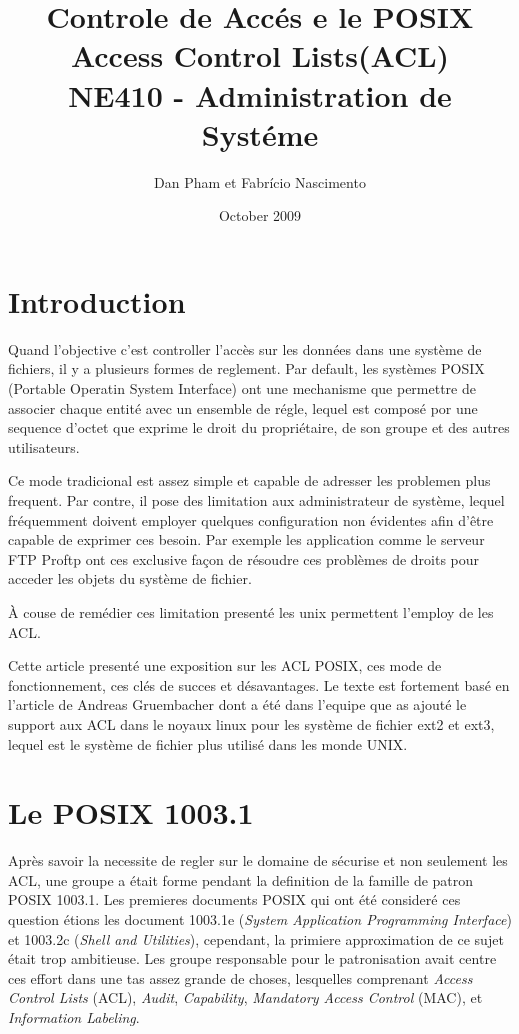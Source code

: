 \documentclass[draft]{article}
\title{\textbf{Controle de Accés e le POSIX Access Control Lists(ACL)} \\ NE410 - Administration de Systéme }
\author{Dan Pham et Fabrício Nascimento}
\date{October 2009}
\begin{document}
\maketitle
\newpage
\section*{Introduction}

Quand l'objective c'est controller l'accès sur les données dans une système de fichiers, il y a plusieurs formes de reglement. Par default, les systèmes POSIX (Portable Operatin System Interface)\cite{ieee1,ieee2} ont une mechanisme que permettre de associer chaque entité avec un ensemble de régle, lequel est composé por une sequence d'octet que exprime le droit du propriétaire, de son groupe et des autres utilisateurs. 

Ce mode tradicional est assez simple et capable de adresser les problemen plus frequent. Par contre, il pose des limitation aux administrateur de système, lequel fréquemment doivent employer quelques configuration non évidentes afin d'être capable de exprimer ces besoin. Par exemple les application comme le serveur FTP Proftp\cite{ftp} ont ces exclusive façon de résoudre ces problèmes de droits pour acceder les objets du système de fichier.

À couse de remédier ces limitation presenté les unix permettent l'employ de les ACL.   

Cette article presenté une exposition sur les ACL POSIX, ces mode de fonctionnement, ces clés de succes et désavantages. Le texte est fortement basé en l'article de Andreas Gruembacher\cite{aclsuse} dont a été dans l'equipe que as ajouté le support aux ACL dans le noyaux linux pour les système de fichier ext2 et ext3, lequel est le système de fichier plus utilisé dans les monde UNIX.

\section*{Le POSIX 1003.1}

Après savoir la necessite de regler sur le domaine de sécurise et non seulement les ACL, une groupe a était forme pendant la definition de la famille de patron POSIX 1003.1. Les premieres documents POSIX qui ont été consideré ces question étions les document 1003.1e (\emph{System Application Programming Interface}) et 1003.2c (\emph{Shell and Utilities}), cependant, la primiere approximation de ce sujet était trop ambitieuse. Les groupe responsable pour le patronisation avait centre ces effort dans une tas assez grande de choses, lesquelles  comprenant \emph{Access Control Lists} (ACL), \emph{Audit}, \emph{Capability},\emph{ Mandatory Access Control }(MAC), et \emph{Information Labeling}\cite{aclsuse}.
\end{document}
